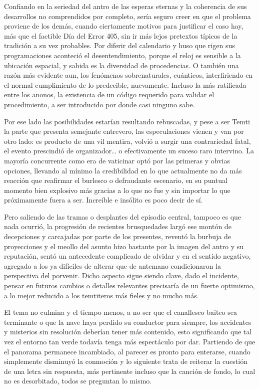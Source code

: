 \documentclass[
]{book}
\begin{document}
Confiando en la seriedad del antro de las esperas eternas y la coherencia de sus desarrollos no comprendidos por completo, sería seguro creer en que el problema proviene de los demás, cuando ciertamente motivos para justificar el caso hay, más que el factible Día del Error 405, sin ir más lejos pretextos típicos de la tradición a su vez probables. Por diferir del calendario y huso que rigen sus programaciones aconteció el desentendimiento, porque el reloj es sensible a la ubicación espacial, y sabida es la diversidad de procedencias. O también una razón más evidente aun, los fenómenos sobrenaturales, cuánticos, interfiriendo en el normal cumplimiento de lo predecible, nuevamente. Incluso la más ratificada entre los anonos, la existencia de un código requerido para validar el procedimiento, a ser introducido por donde casi ninguno sabe.

Por ese lado las posibilidades estarían resultando rebuscadas, y pese a ser Temti la parte que presenta semejante entrevero, las especulaciones vienen y van por otro lado: es producto de una vil mentira, volvió a surgir una contrariedad fatal, el evento prescindió de organizador\ldots{} o efectivamente un suceso raro intervino. La mayoría concurrente como era de vaticinar optó por las primeras y obvias opciones, llevando al mínimo la credibilidad en lo que actualmente no da más reacción que reafirmar el burlesco o defraudante escenario, en su puntual momento bien explosivo más gracias a lo que no fue y sin importar lo que próximamente fuera a ser. Increíble e insólito es poco decir de sí.

Pero saliendo de las tramas o desplantes del episodio central, tampoco es que nada ocurrió, la progresión de recientes brusquedades largó ese montón de decepciones y carcajadas por parte de los presentes, reventó la burbuja de proyecciones y el meollo del asunto hizo bastante por la imagen del antro y su reputación, sentó un antecedente complicado de olvidar y en el sentido negativo, agregado a los ya difíciles de alterar que de antemano condicionaron la perspectiva del porvenir. Dicho aspecto sigue siendo clave, dado el incidente, pensar en futuros cambios o detalles relevantes precisaría de un fuerte optimismo, a lo mejor reducido a los temtiteros más fieles y no mucho más.

El tema no culmina y el tiempo menos, a no ser que el canallesco baiteo sea terminante o que la nave haya perdido su conductor para siempre, los accidentes y misterios sin resolución deberían tener más contenido, esto significando que tal vez el entorno tan verde todavía tenga más espectáculo por dar. Partiendo de que el panorama permanece incambiado, al parecer es pronto para enterarse, cuando simplemente disminuyó la conmoción y lo siguiente trata de reiterar la cuestión de una letra sin respuesta, más pertinente incluso que la canción de fondo, lo cual no es desorbitado, todos se preguntan lo mismo.
\end{document}
